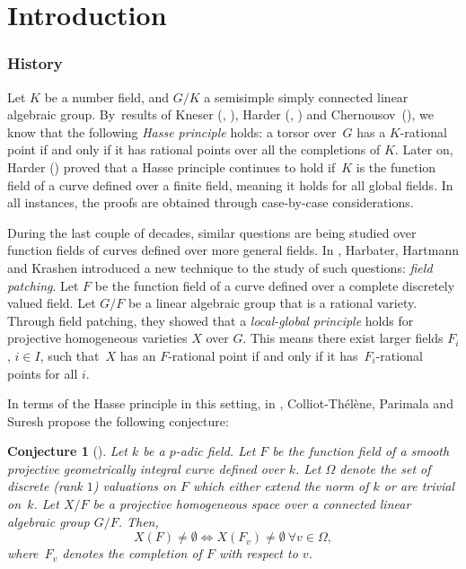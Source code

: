 \documentclass[JEP,XML,SOM,Unicode,NoFloatCountersInSection,published]{cedram}
\newtheorem{conj}[thm]{Conjecture}
\theoremstyle{definition}
\begin{document}
\vspace*{-3\baselineskip}\mbox{}\vskip0pt
\section*{Introduction}
\subsubsection*{History} Let $K$ be a number field, and $G/K$ a semisimple simply connected linear algebraic group. By~results of Kneser (\cite{kne1}, \cite{kne2}), Harder (\cite{harder1}, \cite{harder2}) and Chernousov~\mbox{(\cite{che})}, we know that the following \emph{Hasse principle} holds: a torsor over~$G$ has a $K$-rational point if and only if it has rational points over all the completions of $K$. Later on, Harder (\cite{harder3}) proved that a Hasse principle continues to hold if~$K$ is the function field of a curve defined over a finite field, meaning it holds for all global fields. In all instances, the proofs are obtained through case-by-case considerations.

During the last couple of decades, similar questions are being studied over function fields of curves defined over more general fields. In \cite{hhk}, Harbater, Hartmann and Krashen introduced a new technique to the study of such questions: \emph{field patching}. Let $F$ be the function field of a curve defined over a complete discretely valued field. Let $G/F$ be a linear algebraic group that is a rational variety.
Through field patching, they showed that a \emph{local-global principle} holds for projective homogeneous varieties $X$ over $G$. This means there exist larger fields $F_i$, $i \in I$, such that~$X$ has an $F$-rational point if and only if it has~$F_i$-rational points for all $i$.

In terms of the Hasse principle in this setting, in \cite{ctps}, Colliot-Thélène, Parimala and Suresh propose the following conjecture:

\begin{conj}[{\cite[Conj.\,1]{ctps}}] \label{conj1}
Let $k$ be a $p$-adic field. Let $F$ be the function field of a smooth projective geometrically integral curve defined over $k$. Let $\Omega$ denote the set of discrete (rank $1$) valuations on $F$ which either extend the norm of $k$ or are trivial on~$k$. Let $X/F$ be a projective homogeneous space over a connected linear algebraic group $G/F$. Then,
\[
X(F) \neq \emptyset \iff X(F_v) \neq \emptyset \ \forall v \in \Omega,
\]
where~$F_v$ denotes the completion of $F$ with respect to $v$.
\end{conj}
\end{document}
